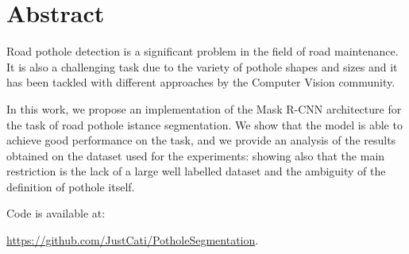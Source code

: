 \chapter*{Abstract} %
Road pothole detection is a significant problem in the field of road maintenance. It is also a challenging task due to the variety of pothole shapes and sizes and it has been tackled with different approaches by the Computer Vision community. 

In this work, we propose an implementation of the Mask R-CNN architecture for the task of road pothole istance segmentation.
We show that the model is able to achieve good performance on the task, and we provide an analysis of the results obtained on the dataset used for the experiments: showing also that the main restriction is the lack of a large well labelled dataset and the ambiguity of the definition of pothole itself.

Code is available at:

\url{https://github.com/JustCati/PotholeSegmentation}.